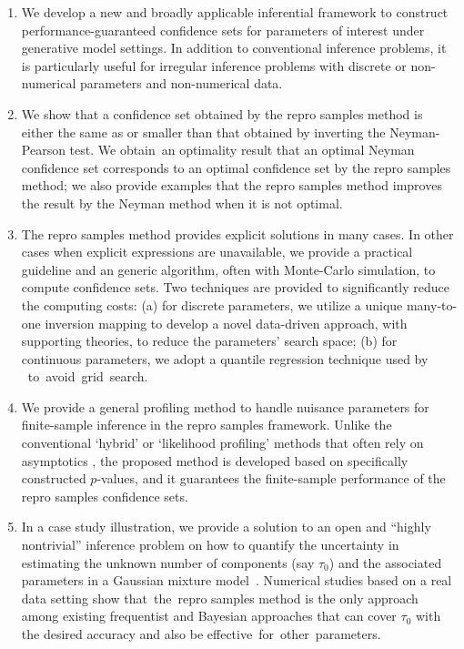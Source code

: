 \documentclass[12pt]{article}
\theoremstyle{shortspace}
\begin{document}

\vspace{-4mm}
\begin{enumerate}[leftmargin=*]
\item We develop 
a new  
and broadly applicable inferential framework to construct 
performance-guaranteed confidence sets 
    for parameters of interest under  
    generative model settings. 
 In addition to 
  conventional inference problems, 
  it
  is particularly 
  useful for irregular inference problems with  
 discrete or non-numerical parameters and non-numerical data. 


\vspace{-4mm}
\item 
We show that 
a confidence set obtained by the repro samples method is 
either the same as or smaller than that obtained by inverting the Neyman-Pearson test.
We obtain~an optimality result that an optimal Neyman confidence set corresponds to an optimal confidence set by the repro samples method; we also provide examples that the repro samples method improves the result by the Neyman method when it is not optimal.

\vspace{-4mm}
\item The repro samples method provides explicit 
solutions in many cases. In other cases when explicit expressions are unavailable, we provide a practical guideline and an  generic algorithm, often with Monte-Carlo simulation, to 
compute confidence sets. Two techniques are provided to significantly reduce the computing costs: (a) for discrete parameters, we utilize a unique many-to-one inversion mapping 
to develop a novel data-driven approach, with supporting theories, to reduce the parameters' search space; (b) for continuous parameters, we adopt a quantile regression technique used  by \cite{dalmasso2022}~to~avoid~grid~search.  

\vspace{-4mm}
\item  
We provide a general profiling method to handle nuisance parameters 
for finite-sample inference in 
the repro samples framework.
Unlike the conventional `hybrid' or `likelihood profiling' methods that often rely on  asymptotics \citep[e.g.,][]{Chuang2000, dalmasso2022}, the proposed 
method is developed based on specifically constructed $p$-values,
and 
it
guarantees the finite-sample performance 
of the repro samples confidence sets. 

\vspace{-2mm}
\item 
In a case study illustration, we provide a solution to an open and “highly nontrivial” inference problem on how to quantify the uncertainty in estimating the unknown number of components (say $\tau_0$) and the associated parameters in a Gaussian mixture model~\citep[cf.,][]{wasserman2020universal}. 
Numerical studies based on a real data setting
show that~the~repro samples method is the only approach among existing frequentist and Bayesian approaches that can cover $\tau_0$ with the desired accuracy and also be effective~for~other~parameters.
\end{enumerate}
\end{document}
